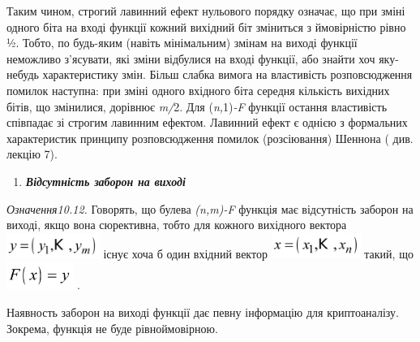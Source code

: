 \documentclass[a4paper]{article}
\newcounter{saveenum}
\newcommand\liststyleWWviiiNumxxix{%
\renewcommand\theenumi{\arabic{enumi}}
\renewcommand\theenumii{\arabic{enumii}}
\renewcommand\theenumiii{\roman{enumiii}}
\renewcommand\theenumiv{\arabic{enumiv}}
\renewcommand\labelenumi{\theenumi.}
\renewcommand\labelenumii{\theenumii.}
\renewcommand\labelenumiii{\theenumiii.}
\renewcommand\labelenumiv{\theenumiv.}
}
\newcounter{}
\begin{document}
Таким чином, строгий лавинний ефект нульового порядку означає, що при зміні
одного біта на вході функції кожний вихідний біт зміниться з ймовірністю рівно
½. Тобто, по будь-яким (навіть мінімальним) змінам на виході функції неможливо
з’ясувати, які зміни відбулися на вході функції, або знайти хоч яку-небудь
характеристику змін.  Більш слабка вимога на властивість розповсюдження помилок
наступна: при зміні одного вхідного біта середня кількість вихідних бітів, що
змінилися, дорівнює \textit{m}\textit{/}2. Для
(\textit{n}\textit{,}1)\textit{{}-}\textit{F}  функції остання властивість
співпадає зі строгим лавинним ефектом. Лавинний ефект є однією з формальних
характеристик принципу  розповсюдження помилок (розсіювання) Шеннона ( див.
лекцію 7). 


\bigskip

\liststyleWWviiiNumxxix
\setcounter{saveenum}{\value{enumi}}
\begin{enumerate}
\setcounter{enumi}{\value{saveenum}}
\item {\bfseries\itshape
Відсутність заборон на виході}
\end{enumerate}
\textit{ Означення10.12.} Говорять, що булева
\textit{(}\textit{n}\textit{,}\textit{m}\textit{)-}\textit{F}  функція має
відсутність заборон на виході, якщо вона сюр{\textquotesingle}ективна, тобто
для кожного вихідного вектора 
\includegraphics[width=1.1953in,height=0.3134in]{crypt-img/crypt-img235.png} 
існує хоча б один вхідний вектор 
\includegraphics[width=1.1465in,height=0.3228in]{crypt-img/crypt-img236.png} 
такий, що 
\includegraphics[width=0.8571in,height=0.3563in]{crypt-img/crypt-img237.png} .

Наявность заборон на виході функції дає певну інформацію для криптоаналізу.
Зокрема, функція не буде рівноймовірною.  


\bigskip
\end{document}
